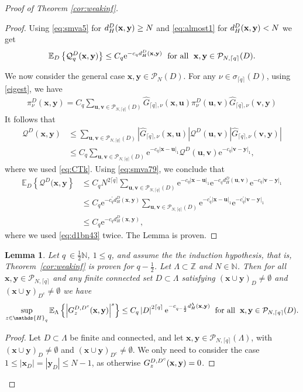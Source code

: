 \documentclass[12pt, a4paper,reqno]{amsart}
\numberwithin{equation}{section}
\newtheorem{lemma}[theorem]{Lemma}
\newcommand\N{\mathbb N}
\newcommand\Z{\mathbb Z}
\newcommand\x{\mathbf{x}}
\newcommand\y{\mathbf{y}}
\renewcommand\u{\mathbf{u}}
\renewcommand\v{\mathbf{v}}
\newcommand\e{\mathrm{e}}
\newcommand\E{\mathbb E}
\newcommand\cQ{\mathcal{Q}}
\newcommand\cP{\mathcal{P}}
\newcommand{\pr}{\prime}
\newcommand\what{\widehat}
\newcommand\be{\begin{equation}\begin{aligned}}
\newcommand\ee{\end{aligned}\end{equation}}
\newcommand{\abs}[1]{\left\lvert #1 \right\rvert}
\newcommand{\set}[1]{\left\{ #1 \right\}}
\newcommand{\cl}[1]{\lceil #1 \rceil}
\newcommand\La{\Lambda}
\newcommand{\eq}[1]{\eqref{#1}}
\newcommand{\mqtx}[1]{\; \ \text{#1}\; \  }
\newcommand{\clq}{\cl{q}}
\begin{document}
\begin{proof}[Proof of  Theorem \ref{cor:weakinf}]
\begin{proof}
Using \eq{eq:smva5} for   $ d_{H}^D({\bf x},{\bf y})   \ge N$ and  \eqref{eq:almost1} for $ d_{H}^D({\bf x},{\bf y})   <N$ we get
\be \label{eq:smva79}
\E_{D}\set{\cQ_q^D ({\bf x},{\bf y})}\le  C_q\e^{-c_q d_{H}^D({\bf x},{\bf y})}  \mqtx{for all}\x,\y\in \cP_{N,\clq}(D).
\ee


 We now consider the general case $\x,\y\in \cP_N(D)$.  For any $\nu \in \sigma_{\clq}  (D)$, using 
\eq{eigest}, we have
\be
\pi_\nu^D (\x,\y)= C_q  \sum_{\u,\v \in \cP_{N,\clq}(D)}    \what G_{\clq,\nu}(\x,\u) \pi_\nu^D (\u,\v){\what G}_{\clq,\nu}(\v,\y)
\ee
It follows that
\be
\cQ^D(\x,\y) &\le \sum_{\u,\v \in \cP_{N,\clq}(D)} \abs{ \what G_{\clq,\nu}(\x,\u) }\cQ^D (\u,\v)\abs{  \what G_{\clq,\nu}(\v,\y)}\\
&  \le C_q \sum_{\u,\v \in \cP_{N,\clq}(D)}  \e^{-c_q\abs{\x-\u}_1}\cQ^D (\u,\v) \e^{-c_q\abs{\v-\y}_1},
\ee
where we used \eqref{eq:CTk}.  Using \eq{eq:smva79}, we conclude that
\be
\E_D\set{\cQ^D(\x,\y} &\le C_q  N^{2\clq} \sum_{\u,\v \in \cP_{N,\clq}(D)}  \e^{-c_q\abs{\x-\u}_1}\e^{- c_q d_H^D(\u,\v) } \e^{-c_q\abs{\v-\y}_1}\\
& \le  C_q  \e^{- c^\pr_q d_H^D(\x,\y)} \sum_{\u,\v \in \cP_{N,\clq}(D)}  \e^{-c^\pr_q\abs{\x-\u}_1}\e^{-c^\pr_q\abs{\v-\y}_1} \\
& \le  C_q \e^{- c_q d_H^D(\x,\y)} ,
\ee  
where we used  \eq{eq:d1bn43} twice.
The Lemma is proven.
\end{proof}




\begin{lemma}\label{prop:decbn}   
Let $q\ \in  \frac 12 \N$, $1\le q $, and   assume the the induction hypothesis,  that is,  Theorem~\ref{cor:weakinf} is proven for $q-\frac 12$. 
Let  $\La \subset \Z$ and  $N\in \N$.
 Then for all $\x,\y\in \cP_{N,\cl{q}}$ and  any finite  connected set $D\subset\La$ satisfying $ (\x\cup \y)_D \neq\emptyset$ and $(\x\cup \y)_{D^c}\neq\emptyset$ we have
\be\label{eq:weakinfdec}
  \sup_{z\in\mathds{H}_q}\E_\La\set{\abs{G^{D,D^c}_{z}({\bf x},{\bf y})}^s}\le C_{ q} \abs{D}^{2\cl{q}} \e^{-c_{q-\frac12} { d_H^\La ({\bf x},{\bf y})} } \mqtx{for all}\x,\y\in \cP_{N,\cl{q}}(D).
\ee 
\end{lemma}

\begin{proof}  Let $D \subset \La$ be  finite and connected, and
let $\x,\y\in \cP_{N,\cl{q}}(\La)$,    with  $ (\x\cup \y)_D \neq\emptyset$ and $(\x\cup \y)_{D^c}\neq\emptyset$.   We only  need  to consider the case  $1\le \abs{\x _ D}= \abs{\y_D}\le N-1  $, as otherwise $G^{D,D^c}_{z}({\bf x},{\bf y})=0$.


\end{proof}
\end{proof}
\end{document}
